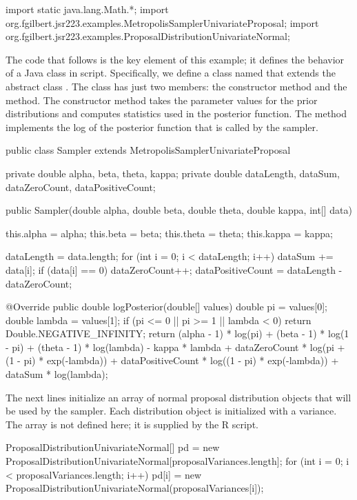\begin{example}
import static java.lang.Math.*;
import org.fgilbert.jsr223.examples.MetropolisSamplerUnivariateProposal;
import org.fgilbert.jsr223.examples.ProposalDistributionUnivariateNormal;
\end{example}

The code that follows is the key element of this example; it defines the behavior of a Java class in script. Specifically, we define a class named  that extends the abstract class . The  class has just two members: the constructor method and the  method. The constructor method takes the parameter values for the prior distributions and computes statistics used in the posterior function. The  method implements the log of the posterior function that is called by the sampler.

\begin{example}
public class Sampler extends MetropolisSamplerUnivariateProposal {
  private double alpha, beta, theta, kappa;
  private double dataLength, dataSum, dataZeroCount, dataPositiveCount;

  public Sampler(double alpha, double beta, double theta, double kappa, int[] data) {
    this.alpha = alpha; this.beta = beta;
    this.theta = theta; this.kappa = kappa;

    dataLength = data.length;
    for (int i = 0; i < dataLength; i++) {
      dataSum += data[i];
      if (data[i] == 0)
        dataZeroCount++;
    }
    dataPositiveCount = dataLength - dataZeroCount;
  }

  @Override
  public double logPosterior(double[] values) {
    double pi = values[0];
    double lambda = values[1];
    if (pi <= 0 || pi >= 1 || lambda < 0)
      return Double.NEGATIVE_INFINITY;
    return (alpha - 1) * log(pi) + (beta - 1) * log(1 - pi) +
      (theta - 1) * log(lambda) - kappa * lambda +
      dataZeroCount * log(pi + (1 - pi) * exp(-lambda)) +
      dataPositiveCount * log((1 - pi) * exp(-lambda)) +
      dataSum * log(lambda);
  }
}
\end{example}

The next lines initialize an array of normal proposal distribution objects that will be used by the sampler. Each distribution object is initialized with a variance. The  array is not defined here; it is supplied by the R script.
\begin{example}
ProposalDistributionUnivariateNormal[] pd =
  new ProposalDistributionUnivariateNormal[proposalVariances.length];
for (int i = 0; i < proposalVariances.length; i++)
  pd[i]	= new ProposalDistributionUnivariateNormal(proposalVariances[i]);
\end{example}

